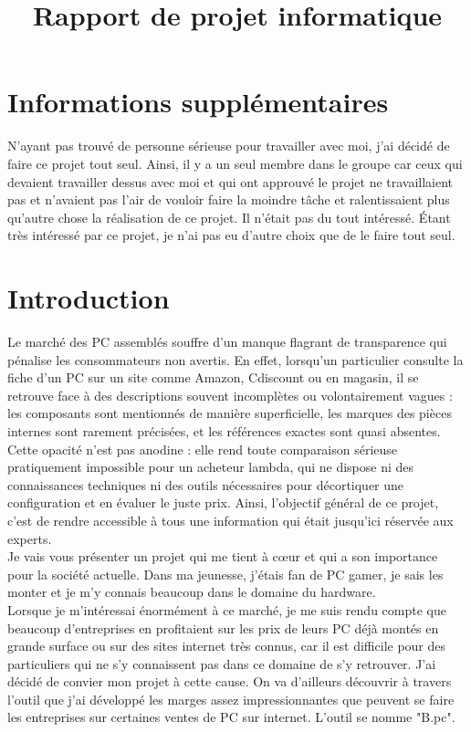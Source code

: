 \documentclass[a4paper, 12pt, twoside]{article}
\title{\textbf{Rapport de projet }\textbf{informatique} 
}
\begin{document}
\pagedegarde
\section*{Informations supplémentaires}
N'ayant pas trouvé de personne sérieuse pour travailler avec moi, j'ai décidé de faire ce projet tout seul. Ainsi, il y a un seul membre dans le groupe car ceux qui devaient travailler dessus avec moi et qui ont approuvé le projet ne travaillaient pas et n’avaient pas l’air de vouloir faire la moindre tâche et ralentissaient plus qu’autre chose la réalisation de ce projet. Il n’était pas du tout intéressé. Étant très intéressé par ce projet, je n'ai pas eu d'autre choix que de le faire tout seul.


\newpage

\tableofcontents
\newpage

\section{Introduction}

Le marché des PC assemblés souffre d'un manque flagrant de transparence qui pénalise les consommateurs non avertis. En effet, lorsqu'un particulier consulte la fiche d'un PC sur un site comme Amazon, Cdiscount ou en magasin, il se retrouve face à des descriptions souvent incomplètes ou volontairement vagues : les composants sont mentionnés de manière superficielle, les marques des pièces internes sont rarement précisées, et les références exactes sont quasi absentes. Cette opacité n'est pas anodine : elle rend toute comparaison sérieuse pratiquement impossible pour un acheteur lambda, qui ne dispose ni des connaissances techniques ni des outils nécessaires pour décortiquer une configuration et en évaluer le juste prix. Ainsi, l'objectif général de ce projet, c'est de rendre accessible à tous une information qui était jusqu'ici réservée aux experts. \\

Je vais vous présenter un projet qui me tient à cœur et qui a son importance pour la société actuelle. Dans ma jeunesse, j’étais fan de PC gamer, je sais les monter et je m’y connais beaucoup dans le domaine du hardware. \\

Lorsque je m’intéressai énormément à ce marché, je me suis rendu compte que beaucoup d’entreprises en profitaient sur les prix de leurs PC déjà montés en grande surface ou sur des sites internet très connus, car il est difficile pour des particuliers qui ne s’y connaissent pas dans ce domaine de s’y retrouver. J’ai décidé de convier mon projet à cette cause. On va d'ailleurs découvrir à travers l'outil que j'ai développé les marges assez impressionnantes que peuvent se faire les entreprises sur certaines ventes de PC sur internet. L'outil se nomme "B.pc".
\end{document}
